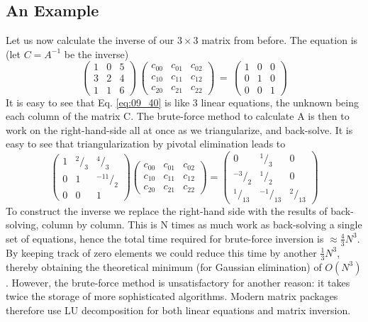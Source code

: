 \subsection{An Example} 
Let us now calculate the inverse of our $3\times 3$ matrix from before.
The equation is (let $C = A^{-1}$ be the inverse)
\begin{equation}
    \label{eq:09_40}
    \begin{pmatrix}
        1&0 &5\\ 
        3&2 &4\\ 
        1&1 &6
    \end{pmatrix}
    \,
    \begin{pmatrix}
        c_{00}&c_{01} &c_{02}\\ 
        c_{10}&c_{11} &c_{12}\\ 
        c_{20}&c_{21} &c_{22}
    \end{pmatrix}
    \, = \,
    \begin{pmatrix}
        1&0 &0\\ 
        0&1 &0\\ 
        0&0 &1
    \end{pmatrix}
\end{equation} 
It is easy to see that Eq. \ref{eq:09_40} is like 3 linear equations, the unknown
being each column of the matrix C. The brute-force method to
calculate A is then to work on the right-hand-side all at once as
we triangularize, and back-solve. It is easy to see that
triangularization by pivotal elimination leads to
\begin{equation}
    \label{eq:09_41}
    \begin{pmatrix}
        1&^2/_3 &^4/_3\\ 
        0&1 &^{-11}/_2\\ 
        0&0 &1
    \end{pmatrix}
    \begin{pmatrix}
        c_{00}&c_{01} &c_{02}\\ 
        c_{10}&c_{11} &c_{12}\\ 
        c_{20}&c_{21} &c_{22}
    \end{pmatrix}
    =
    \begin{pmatrix}
        0&^1/_3&0\\ 
        ^{-3}/_2 &^1/_2&0\\ 
         ^1/_{13} &         ^{-1}/_{13} &        ^2/_{13}
    \end{pmatrix}
\end{equation} 
To construct the inverse we replace the right-hand side with the 
results of back-solving, column by column. This is N times as
much work as back-solving a single set of equations, hence the
total time required for brute-force inversion is $\approx \frac{4}{3}N^3$. By keeping track of zero elements we could reduce this time by another
$\frac{1}{3}N^3$, thereby obtaining the theoretical minimum (for Gaussian
elimination) of $O(N^3)$. However, the brute-force method is unsatisfactory for another reason: it takes twice the storage of more
sophisticated algorithms. Modern matrix packages therefore use
LU decomposition for both linear equations and matrix inversion.

